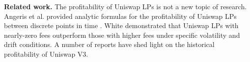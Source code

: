 




    \textbf{Related work.}
    The profitability of Uniswap LPs is not a new topic of research. 
    Angeris et al. provided analytic formulas for the profitability of Uniswap LPs between discrete points in time \cite{angeris2019analysis}. %
    White demonstrated that Uniswap LPs with nearly-zero fees outperform those with higher fees under specific volatility and drift conditions. %
    A number of reports have shed light on the historical profitability of Uniswap V3. %
    
